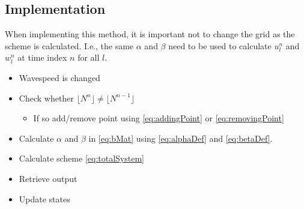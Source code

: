 \subsection{Implementation}
When implementing this method, it is important not to change the grid as the scheme is calculated. I.e., the same $\alpha$ and $\beta$ need to be used to calculate $u^n_l$ and $w^n_l$ at time index $n$ for all $l$.


\begin{itemize}
    \item Wavespeed is changed
    \item Check whether $\lfloor N^n\rfloor \neq \lfloor N^{n-1} \rfloor$
    \begin{itemize}
        \item If so add/remove point using \eqref{eq:addingPoint} or \eqref{eq:removingPoint}
    \end{itemize}
    \item Calculate $\alpha$ and $\beta$ in \eqref{eq:bMat} using \eqref{eq:alphaDef} and \eqref{eq:betaDef}.
    \item Calculate scheme \eqref{eq:totalSystem}
    \item Retrieve output
    \item Update states
\end{itemize}
